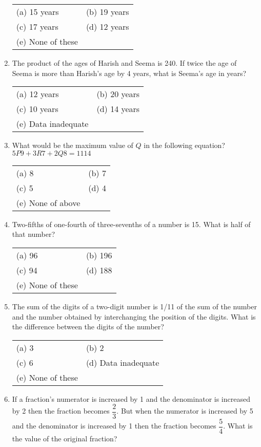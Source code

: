 \begin{multicols}{2}
\begin{enumerate}[leftmargin=*]
\begin{tabular}{l@{\qquad\quad}l}
(a) 15 years & (b) 19 years \\
(c) 17 years & (d) 12 years \\
(e) None of these
\end{tabular}

\item The product of the ages of Harish and Seema is 240. If twice the age of Seema is more than Harish's age by 4 years, what is Seema's age in years?

\begin{tabular}{l@{\qquad\quad}l}
(a) 12 years & (b) 20 years \\
(c) 10 years & (d) 14 years \\
(e) Data inadequate
\end{tabular}

\item What would be the maximum value of $Q$ in the following equation? $5P9 + 3R7 + 2Q8 = 1114$

\begin{tabular}{l@{\qquad\quad}l}
(a) 8 & (b) 7 \\
(c) 5 & (d) 4 \\
(e) None of above
\end{tabular}

\item Two-fifths of one-fourth of three-sevenths of a number is 15. What is half of that number?

\begin{tabular}{l@{\qquad\quad}l}
(a) 96 & (b) 196 \\
(c) 94 & (d) 188 \\
(e) None of these
\end{tabular}

\item The sum of the digits of a two-digit number is 1/11 of the sum of the number and the number obtained by interchanging the position of the digits. What is the difference between the digits of the number? 

\begin{tabular}{l@{\qquad\quad}l}
(a) 3 & (b) 2 \\
(c) 6 & (d) Data inadequate \\
(e) None of these
\end{tabular}

\item If a fraction's numerator is increased by 1 and the denominator is increased by 2 then the fraction becomes $\dfrac{2}{3}$. But when the numerator is increased by 5 and the denominator is increased by 1 then the fraction becomes $\dfrac{5}{4}$. What is the value of the original fraction?


\end{enumerate}
\end{multicols}

